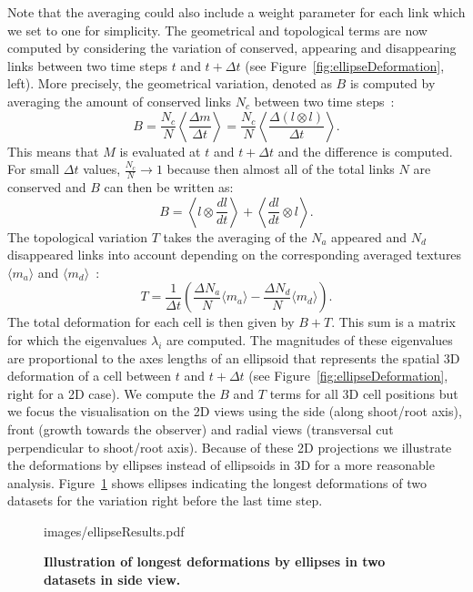 \documentclass[11pt,a4paper, draft]{article}
\begin{document}
\noindent
Note that the averaging could also include a weight parameter for each link which we set to one for simplicity. The geometrical and topological terms are now computed by considering the variation of conserved, appearing and disappearing links between two time steps $t$ and $t + \Delta t$ (see Figure~\ref{fig:ellipseDeformation}, left). More precisely, the geometrical variation, denoted as $B$ is computed by averaging the amount of conserved links $N_c$ between two time steps~\cite{graner_et_al_2008}:
\begin{equation}
B = \frac{N_c}{N} \left\langle \frac{\Delta m}{\Delta t} \right\rangle = \frac{N_c}{N} \left\langle \frac{\Delta (l \otimes l) }{\Delta t} \right\rangle.
\end{equation}
This means that $M$ is evaluated at $t$ and $t + \Delta t$ and the difference is computed. For small $\Delta t$ values, $\frac{N_c}{N} \rightarrow 1$ because then almost all of the total links $N$ are conserved and $B$ can then be written as:
\begin{equation}
B = \left\langle l \otimes \frac{dl}{dt} \right\rangle + \left\langle \frac{dl}{dt} \otimes l \right\rangle.
\end{equation}
The topological variation $T$ takes the averaging of the $N_a$ appeared and $N_d$ disappeared links into account depending on the corresponding averaged textures $\langle m_a \rangle$ and $\langle m_d \rangle$~\cite{graner_et_al_2008}:
\begin{equation}
T = \frac{1}{\Delta t} \left( \frac{\Delta N_a}{N} \langle m_a \rangle - \frac{\Delta N_d}{N}  \langle m_d \rangle \right).
\end{equation}
The total deformation for each cell is then given by $B+T$. This sum is a matrix for which the eigenvalues $\lambda_i$ are computed. The magnitudes of these eigenvalues are proportional to the axes lengths of an ellipsoid that represents the spatial 3D deformation of a cell between $t$ and $t + \Delta t$ (see Figure~\ref{fig:ellipseDeformation}, right for a 2D case). We compute the $B$ and $T$ terms for all 3D cell positions but we focus the visualisation on the 2D views using the side (along shoot/root axis), front (growth towards the observer) and radial views (transversal cut perpendicular to shoot/root axis). Because of these 2D projections we illustrate the deformations by ellipses instead of ellipsoids in 3D for a more reasonable analysis. Figure~\ref{fig:ellipseResults} shows ellipses indicating the longest deformations of two datasets for the variation right before the last time step.
%
\begin{figure}[htbp]
	\begin{center}
		\begin{overpic}[width=1.\linewidth]{images/ellipseResults.pdf}
		\end{overpic}
\caption[Illustration of longest deformations by ellipses in two datasets in side view.]
{
{\bf Illustration of longest deformations by ellipses in two datasets in side view.}
}
	\label{fig:ellipseResults}
	\end{center}
\end{figure}
%
\end{document}
